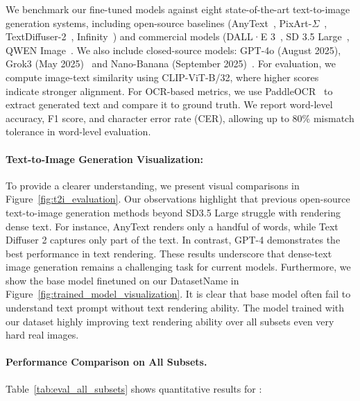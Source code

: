 We benchmark our fine-tuned models against eight state-of-the-art text-to-image generation systems, including open-source baselines (AnyText~\cite{anytext}, PixArt-$\Sigma$~\cite{chen2024pixart}, TextDiffuser-2~\cite{textdiffuser2}, Infinity~\cite{han2024infinity}) and commercial models (DALL·E 3~\cite{dalle3}, SD 3.5 Large~\cite{sd3}, QWEN Image~\cite{qwenimage}. 
We also include closed-source models: GPT-4o (August 2025), Grok3 (May 2025)~\cite{xai2025grok3} and Nano-Banana (September 2025)~\cite{nano_banana_2025}.
For evaluation, we compute image-text similarity using CLIP-ViT-B/32, where higher scores indicate stronger alignment. 
For OCR-based metrics, we use PaddleOCR~\cite{paddleocr} to extract generated text and compare it to ground truth. We report word-level accuracy, F1 score, and character error rate (CER), allowing up to 80\% mismatch tolerance in word-level evaluation.





\paragraph{Text-to-Image Generation Visualization:}
To provide a clearer understanding, we present visual comparisons in Figure~\ref{fig:t2i_evaluation}.
Our observations highlight that previous open-source text-to-image generation methods beyond SD3.5 Large struggle with rendering dense text. 
For instance, AnyText renders only a handful of words, while Text Diffuser 2 captures only part of the text.
In contrast, GPT-4 demonstrates the best performance in text rendering. 
These results underscore that dense-text image generation remains a challenging task for current models.
Furthermore, we show the base model finetuned on our DatasetName in Figure~\ref{fig:trained_model_visualization}.
It is clear that base model often fail to understand text prompt without text rendering ability.
The model trained with our dataset highly improving text rendering ability over all subsets even very hard real images.


\paragraph{Performance Comparison on All Subsets.}
Table~\ref{tab:eval_all_subsets} shows quantitative results for \EvalDatasetName:

